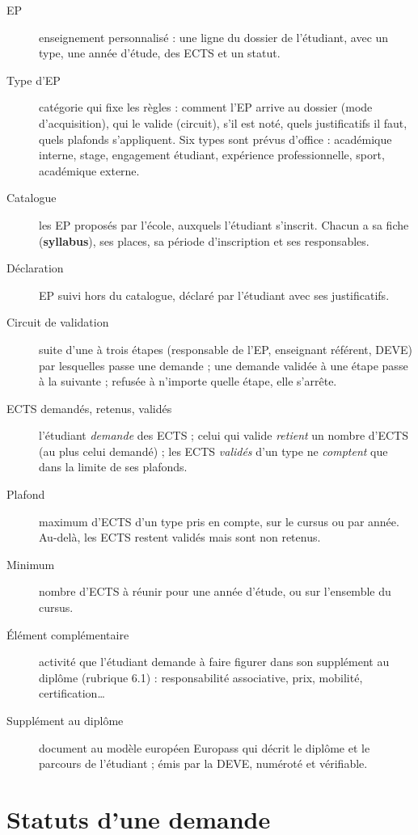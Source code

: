 \documentclass[11pt,a4paper]{article}
\begin{document}
\begin{description}
  \item[EP] enseignement personnalisé : une ligne du dossier de l'étudiant, avec un type, une
    année d'étude, des ECTS et un statut.
  \item[Type d'EP] catégorie qui fixe les règles : comment l'EP arrive au dossier (mode
    d'acquisition), qui le valide (circuit), s'il est noté, quels justificatifs il faut, quels
    plafonds s'appliquent. Six types sont prévus d'office : académique interne, stage,
    engagement étudiant, expérience professionnelle, sport, académique externe.
  \item[Catalogue] les EP proposés par l'école, auxquels l'étudiant s'inscrit. Chacun a sa
    fiche (\textbf{syllabus}), ses places, sa période d'inscription et ses responsables.
  \item[Déclaration] EP suivi hors du catalogue, déclaré par l'étudiant avec ses justificatifs.
  \item[Circuit de validation] suite d'une à trois étapes (responsable de l'EP, enseignant
    référent, DEVE) par lesquelles passe une demande ; une demande validée à une étape passe
    à la suivante ; refusée à n'importe quelle étape, elle s'arrête.
  \item[ECTS demandés, retenus, validés] l'étudiant \emph{demande} des ECTS ; celui qui valide
    \emph{retient} un nombre d'ECTS (au plus celui demandé) ; les ECTS \emph{validés} d'un type
    ne \emph{comptent} que dans la limite de ses plafonds.
  \item[Plafond] maximum d'ECTS d'un type pris en compte, sur le cursus ou par année. Au-delà,
    les ECTS restent validés mais sont \og non retenus\fg{}.
  \item[Minimum] nombre d'ECTS à réunir pour une année d'étude, ou sur l'ensemble du cursus.
  \item[Élément complémentaire] activité que l'étudiant demande à faire figurer dans son
    supplément au diplôme (rubrique 6.1) : responsabilité associative, prix, mobilité,
    certification\dots
  \item[Supplément au diplôme] document au modèle européen Europass qui décrit le diplôme et
    le parcours de l'étudiant ; émis par la DEVE, numéroté et vérifiable.
\end{description}

\section{Statuts d'une demande}\label{sec:statuts}
\end{document}
